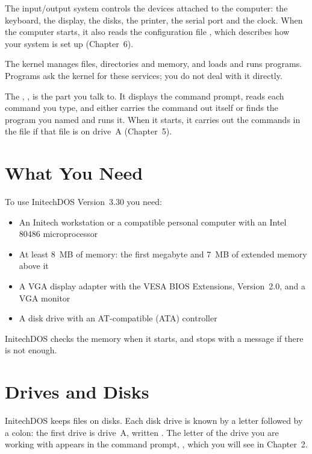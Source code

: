 The input/output system controls the devices
attached to the computer: the keyboard, the display, the disks, the printer,
the serial port and the clock.  When the computer starts, it also reads the
configuration file ,
which describes how your system is set up (Chapter~6).

The kernel manages files, directories and memory, and
loads and runs programs.  Programs ask the kernel for these services; you
do not deal with it directly.

The ,
, is the part you
talk to.  It displays the command prompt, reads each command you type, and
either carries the command out itself or finds the program you named and
runs it.  When it starts, it carries out the commands in the file
 if that file
is on drive~A (Chapter~5).

\section{What You Need}
To use InitechDOS Version~3.30 you need:
\begin{itemize}
\item An Initech workstation or a compatible personal computer with an
  Intel 80486 microprocessor
\item At least 8~MB of memory: the first megabyte and 7~MB of extended
  memory above it
\item A VGA display adapter with the VESA BIOS Extensions, Version~2.0,
  and a VGA monitor
\item A disk drive with an AT-compatible (ATA) controller
\end{itemize}
InitechDOS checks the memory when it starts, and stops with a message if
there is not enough.

\section{Drives and Disks}
InitechDOS keeps files on disks.  Each disk drive is known by a letter
followed by a colon: the first drive is drive~A, written .
The letter of the drive you are working with appears in the command prompt,
, which you will see in Chapter~2.

